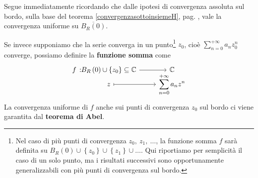 \begin{demonstration}
	Segue immediatamente ricordando che dalle ipotesi di convergenza assoluta sul bordo, sulla base del teorema \ref{convergenzasottoinsiemeH}, pag. \pageref{convergenzasottoinsiemeH}, vale la convergenza uniforme su $\overline{B_R\left(0\right)}$.
\end{demonstration}
Se invece supponiamo che la serie converga in un punto\footnote{Nel caso di più punti di convergenza $z_0,\ z_1,\ \ldots$, la funzione somma $f$ sarà definita su $B_R\left(0\right)\cup\left\{z_0\right\}\cup\left\{z_1\right\}\cup\ldots$. Qui riportiamo per semplicità il caso di un solo punto, ma i risultati successivi sono opportunamente generalizzabili con più punti di convergenza sul bordo.} $z_0$, cioè $\displaystyle\sum_{n=0}^{+\infty}a_nz_0^n$ converge, possiamo definire la \textbf{funzione somma} come
\begin{equation}
	\funztot{f}{B_R\left(0\right)\cup\left\{z_0\right\}\subseteq\complexset}{\complexset}{z}{\displaystyle\sum_{n=0}^{+\infty}a_nz^n}
\end{equation}
La convergenza uniforme di $f$ anche sui punti di convergenza $z_0$ sul bordo ci viene garantita dal \textbf{teorema di Abel}.
